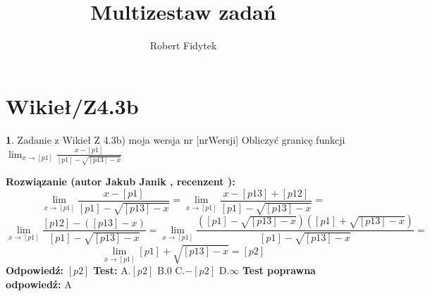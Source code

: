 \documentclass[12pt, a4paper]{article}
\title{Multizestaw zadań}
\author{Robert Fidytek}
\date{}
\theoremstyle{definition} %
\newtheorem{zad}{}
\newcommand{\kategoria}[1]{\section{#1}} %
\newcommand{\zadStart}[1]{\begin{zad}#1\newline} %
\newcommand{\zadStop}{\end{zad}}   %
\newcommand{\rozwStart}[2]{\noindent \textbf{Rozwiązanie (autor #1 , recenzent #2): }\newline} %
\newcommand{\rozwStop}{\newline}                                            %
\newcommand{\odpStart}{\noindent \textbf{Odpowiedź:}\newline}    %
\newcommand{\odpStop}{\newline}                                             %
\newcommand{\testStart}{\noindent \textbf{Test:}\newline} %
\newcommand{\testStop}{\newline} %
\newcommand{\kluczStart}{\noindent \textbf{Test poprawna odpowiedź:}\newline} %
\newcommand{\kluczStop}{\newline} %
\begin{document}
\maketitle


\kategoria{Wikieł/Z4.3b}
\zadStart{Zadanie z Wikieł Z 4.3b) moja wersja nr [nrWersji]}
Obliczyć granicę funkcji $\lim_{x \to [p1]} \frac{x-[p1]}{[p1]-\sqrt{[p13]-x}}$
\zadStop
\rozwStart{Jakub Janik}{}
$$\lim_{x \to [p1]} \frac{x-[p1]}{[p1]-\sqrt{[p13]-x}}=\lim_{x \to [p1]} \frac{x-[p13]+[p12]}{[p1]-\sqrt{[p13]-x}}=$$
$$\lim_{x \to [p1]} \frac{[p12]-([p13]-x)}{[p1]-\sqrt{[p13]-x}}=\lim_{x \to [p1]} \frac{([p1]-\sqrt{[p13]-x})([p1]+\sqrt{[p13]-x})}{[p1]-\sqrt{[p13]-x}}=$$
$$\lim_{x \to [p1]} [p1]+\sqrt{[p13]-x}=[p2]$$
\rozwStop
\odpStart
$[p2]$
\odpStop
\testStart
A.$[p2]$
B.$0$
C.$-[p2]$
D.$\infty$
\testStop
\kluczStart
A
\kluczStop
\end{document}
